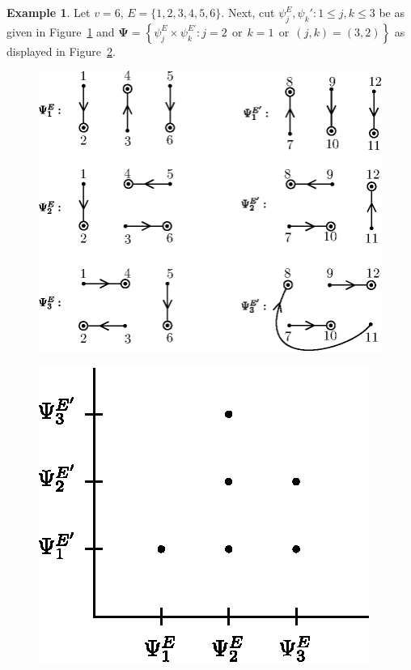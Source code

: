 \documentclass[a4paper,12pt]{article}
\theoremstyle{definition}
\theoremstyle{underlinethm}
\newtheorem{example}{Example}[section]
\theoremstyle{definition}
\begin{document}
\begin{example}\label{example-3.4}
Let $v=6$, $E = \{1,2,3,4,5,6\}$. Next, cut $\psi_{j}^{E}, \psi_{k}' : 1 \leq j, k\leq 3$ be as given in Figure~\ref{fig12} and $\boldsymbol{\Psi} = \left\{\psi_{j}^{E} \times \psi_{k}^{E'} : j=2~~\text{or}~~ k=1~~\text{or}~~(j,k)=(3,2)\right\}$ as displayed in Figure~\ref{fig13}.
\end{example}

\newpage

\begin{figure}[h]
\centering
\includegraphics[scale=1]{figure/figures/fig12.eps}
\caption{}\label{fig12}
\end{figure}
\begin{figure}[h]
\centering
\includegraphics[scale=.9]{figure/figures/fig13.eps}
\caption{}\label{fig13}
\end{figure}
\end{document}
